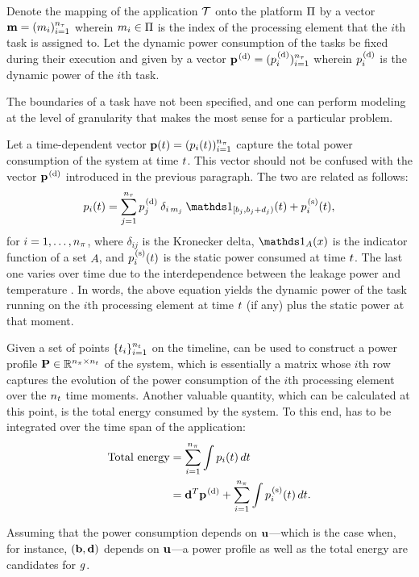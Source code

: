 Denote the mapping of the application $\mathcal{T}$ onto the platform $\Pi$ by a
vector $\mathbf{m} = (m_i)_{i = 1}^{{n_\tau}}$ wherein $m_i \in \Pi$ is the index of
the processing element that the $i$th task is assigned to. Let the dynamic power
consumption of the tasks be fixed during their execution and given by a vector
$\mathbf{p}^{\text{\kern0.1em(d)}} = (p^{\text{\kern0.1em(d)}}_i)_{i = 1}^{{n_\tau}}$ wherein $p^{\text{\kern0.1em(d)}}_i$ is the
dynamic power of the $i$th task.

\begin{remark}
The boundaries of a task have not been specified, and one can perform modeling
at the level of granularity that makes the most sense for a particular problem.
\end{remark}

Let a time-dependent vector $\mathbf{p}(t) = (p_i(t))_{i = 1}^{{n_\pi}}$ capture the
total power consumption of the system at time $t$. This vector should not be
confused with the vector $\mathbf{p}^{\text{\kern0.1em(d)}}$ introduced in the previous paragraph.
The two are related as follows:
\begin{equation} \elab{power}
  \p_i(\t) = \sum_{j = 1}^\nt \p^\dynamic_j \: \delta_{i\,m_j} \: \one_{[\b_j, \b_j + \d_j)}(\t) + \p^\static_i(\t),
\end{equation}
for $i = 1, \dots, {n_\pi}$, where $\delta_{ij}$ is the Kronecker delta, $\one_A(x)$
is the indicator function of a set $A$, and $p^{\text{\kern0.1em(s)}}_i(t)$ is the static
power consumed at time $t$. The last one varies over time due to the
interdependence between the leakage power and temperature \cite{liu2007}. In
words, the above equation yields the dynamic power of the task running on the
$i$th processing element at time $t$ (if any) plus the static power at that
moment.

Given a set of points $\{ t_i \}_{i = 1}^{n_t}$ on the timeline,  can
be used to construct a power profile $\mathbf{P} \in \mathbb{R}^{{n_\pi} \times {n_t}}$ of the
system, which is essentially a matrix whose $i$th row captures the evolution of
the power consumption of the $i$th processing element over the ${n_t}$ time
moments. Another valuable quantity, which can be calculated at this point, is
the total energy consumed by the system. To this end,  has to be
integrated over the time span of the application:
\begin{align}
  \text{Total energy} &= \sum_{i = 1}^\np \int \p_i(\t) \, d\t \elab{total-energy} \\
                      &= \vd^T \vp^\dynamic + \sum_{i = 1}^\np \int \p^\static_i(\t) \, d\t. \nonumber
\end{align}

Assuming that the power consumption depends on $\mathbf{u}$---which is the case when,
for instance, $(\mathbf{b}, \mathbf{d})$ depends on $\mathbf{u}$---a power profile as well as the
total energy are candidates for $g$.
